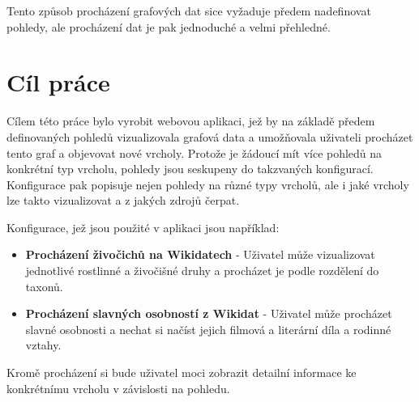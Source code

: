 Tento způsob procházení grafových dat sice vyžaduje předem nadefinovat pohledy, ale procházení dat je pak jednoduché a velmi přehledné.

\section{Cíl práce}

Cílem této práce bylo vyrobit webovou aplikaci, jež by na základě předem definovaných pohledů vizualizovala grafová data a umožňovala uživateli procházet tento graf a objevovat nové vrcholy. Protože je žádoucí mít více pohledů na konkrétní typ vrcholu, pohledy jsou seskupeny do takzvaných konfigurací. Konfigurace pak popisuje nejen pohledy na různé typy vrcholů, ale i jaké vrcholy lze takto vizualizovat a z jakých zdrojů čerpat.

Konfigurace, jež jsou použité v aplikaci jsou například:
\begin{itemize}
    \item \textbf{Procházení živočichů na Wikidatech} - Uživatel může vizualizovat jednotlivé rostlinné a živočišné druhy a procházet je podle rozdělení do taxonů.
    \item \textbf{Procházení slavných osobností z Wikidat} - Uživatel může procházet slavné osobnosti a nechat si načíst jejich filmová a literární díla a rodinné vztahy.
\end{itemize}

Kromě procházení si bude uživatel moci zobrazit detailní informace ke konkrétnímu vrcholu v závislosti na pohledu.
